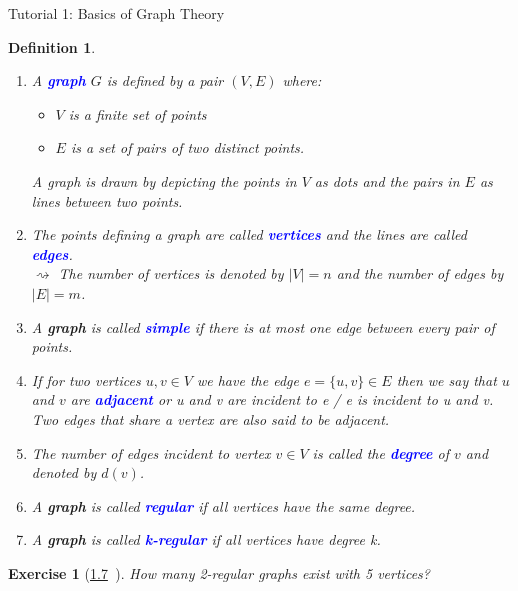 \documentclass[10pt]{report}
\makeatletter
\numberwithin{dummy}{section}
\theoremstyle{ocrenumbox}
\newtheorem{definitionT}{Exercise}[]
\theoremstyle{grayman}
\newtheorem{definitionTTTT}{Definition}[]
\newenvironment{exo}{\begin{dBox}\begin{definitionT}}{\end{definitionT}\end{dBox}}
\newenvironment{voc}{\begin{vBox}\begin{definitionTTTT}}{\end{definitionTTTT}\end{vBox}}
\renewcommand{\section}{\@startsection{section}{1}{\z@}
{-4ex \@plus -1ex \@minus -.4ex}
{1ex \@plus.2ex }
{\normalfont\large\sffamily\bfseries}}
\makeatother
\begin{document}
\section{Tutorial 1: Basics of Graph Theory}


\begin{voc}{}{}\leavevmode
\begin{enumerate}
    \item A \textbf{\textcolor{blue}{graph}} $G$ is defined by a pair $(V, E)$ where:
    \begin{itemize}
        \item  $V$ is a finite set of points 
        \item $E$ is a set of pairs of two distinct points. 
    \end{itemize}
    A graph is drawn by depicting the
points in $V$ as dots and the pairs in $E$ as lines between two points.
    \item The points defining a graph are called \textbf{\textcolor{blue}{vertices}} and the lines are called \textbf{\textcolor{blue}{edges}}.\\
     $\rightsquigarrow$ The number of vertices is denoted by $\lvert V \rvert = n$ and the number of
edges by $\lvert E \rvert = m$.
    \item  A \textbf{graph} is called \textbf{\textcolor{blue}{simple}} if there is at most one edge between every pair of points.
    \item If for two vertices $u, v \in V$ we have the edge $e = \{u, v\} \in E$ then we say that $u$ and $v$ are \textbf{\textcolor{blue}{adjacent}} or u and v are incident to e / e is incident to u and v.\\ Two edges that share a vertex are
also said to be adjacent.
    \item The number of edges incident to vertex $v \in V$ is called the \textbf{\textcolor{blue}{degree}} of $v$ and denoted by $d(v)$. 
    \item A \textbf{graph} is called \textbf{\textcolor{blue}{regular}} if all vertices have the same degree.
    \item A \textbf{graph} is called \textbf{\textcolor{blue}{k-regular}} if all vertices have degree k.
\end{enumerate}

\end{voc}
\begin{exo}[\hypertarget{exo17}{\hyperlink{so17}{1.7}}$\phantom{a}$]
 How many 2-regular graphs exist with 5 vertices?
\end{exo}
\end{document}
